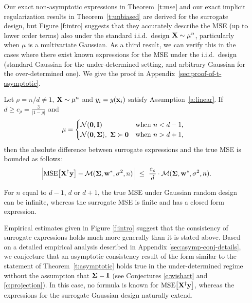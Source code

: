 \documentclass[11pt]{article}
\begin{document}
Our exact non-asymptotic expressions in Theorem~\ref{t:mse} and
our exact implicit regularization results in Theorem~\ref{t:unbiased}
are derived for the surrogate design, but Figure \ref{f:intro}
suggests that they accurately describe the MSE (up to lower order
terms) also under the standard i.i.d.~design $\mathbf X\sim\mu^n$,
particularly when $\mu$ is a multivariate Gaussian.
As a third result, we can verify this in the cases where there exist
known expressions for the MSE under the i.i.d.~design (standard
Gaussian for the under-determined setting, and
arbitrary Gaussian for the over-determined one).
We give the proof in Appendix~\ref{sec:proof-of-t-asymptotic}.
\begin{theorem}
\label{t:asymptotic}
Let $\rho=n/d\neq 1$, $\mathbf X\sim \mu^n$
and $y_i=y(\mathbf x_i)$ satisfy Assumption~\ref{a:linear}. If $d\geq
c_\rho=\frac3{|1-\rho|}$ and
\begin{align*}
  \mu &= \begin{cases}
    \mathcal{N}(\mathbf 0,\mathbf I)&\text{when }n<d-1,\\
    \mathcal{N}(\mathbf 0,\mathbf{\Sigma}),\ \mathbf{\Sigma}\succ\mathbf 0 &\text{when }n>d+1,
  \end{cases}
\end{align*}
then the absolute difference between surrogate
expressions and the true MSE is bounded as follows:
\begin{align*}
\Big|{\mathrm{MSE}\big[\mathbf X^\dagger\mathbf y\big]}-\mathcal M(\mathbf{\Sigma}, \mathbf w^*,\sigma^2,n)\Big|\ \leq\
\frac{c_\rho}{d} \cdot \mathcal M(\mathbf{\Sigma},\mathbf w^*,\sigma^2,n).
\end{align*}
\end{theorem}
\begin{remark}
For $n$ equal to $d-1$, $d$ or $d+1$, the true MSE under Gaussian
random design can be infinite, whereas the
surrogate MSE is finite and has a closed form expression.
\end{remark}

\noindent
Empirical estimates given in Figure
\ref{f:intro} suggest that the consistency of surrogate expressions
holds much more generally than it is stated above. Based on a detailed
empirical analysis described in Appendix \ref{sec:asymp-conj-details},
we conjecture that an asymptotic consistency 
result of the form similar to the statement of Theorem~\ref{t:asymptotic}
holds true in the under-determined regime without the assumption that
$\mathbf{\Sigma}=\mathbf I$ (see Conjectures \ref{c:wishart} and
\ref{c:projection}). In this case, no formula is known for 
${\mathrm{MSE}\big[\mathbf X^\dagger\mathbf y\big]}$, whereas the expressions for the surrogate
Gaussian design naturally extend.
\end{document}
